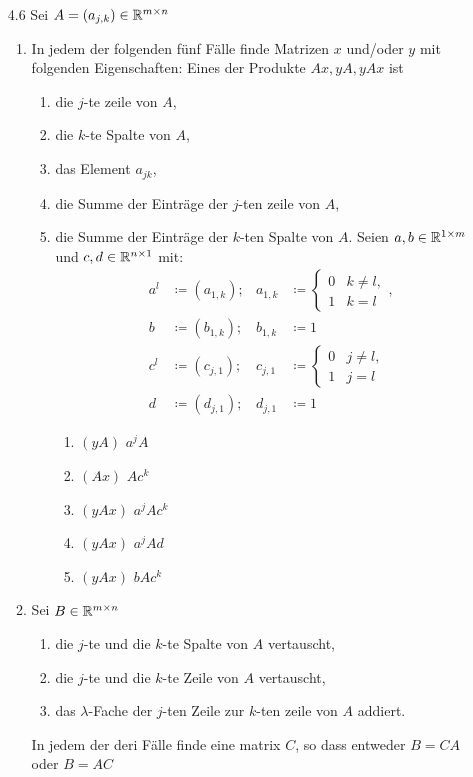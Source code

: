 \documentclass{HM}
\begin{document}
\begin{enumerate}
\begin{enumerate}
\end{enumerate}
\item [4.6] Sei $A=(a_{j,k})\in\mathbb{R}^{m\times n}$
\begin{enumerate}
\item In jedem der folgenden fünf Fälle finde Matrizen $x$ und/oder $y$ mit folgenden Eigenschaften: Eines der Produkte $Ax, yA, yAx$ ist
\begin{enumerate}
\item die $j$-te zeile von $A$,
\item die $k$-te Spalte von $A$,
\item das Element $a_{jk}$,
\item die Summe der Einträge der $j$-ten zeile von $A$,
\item die Summe der Einträge der $k$-ten Spalte von $A$.
Seien $a,b\in\mathbb{R}^{1\times m}$ und $c,d\in\mathbb{R}^{n\times 1}$ mit:
\begin{align*}
a^l&\coloneqq (a_{1,k}); &a_{1,k}&\coloneqq\begin{cases}
0 &k\neq l,\\
1 &k=l 
\end{cases},\\
b&\coloneqq (b_{1,k}); &b_{1,k}&\coloneqq 1\\
c^l&\coloneqq (c_{j,1}); &c_{j,1}&\coloneqq \begin{cases}
0 &j\neq l,\\
1 &j=l
\end{cases}\\
d&\coloneqq (d_{j,1}); &d_{j,1}&\coloneqq 1
\end{align*}
\begin{enumerate}
\item $(yA)$  $a^jA$
\item $(Ax)$  $Ac^k$
\item $(yAx)$ $a^jAc^k$
\item $(yAx)$ $a^jAd$
\item $(yAx)$ $bAc^k$
\end{enumerate}
\end{enumerate}
\item Sei $B\in\mathbb{R}^{m\times n}$
\begin{enumerate}
\item die $j$-te und die $k$-te Spalte von $A$ vertauscht,
\item die $j$-te und die $k$-te Zeile von $A$ vertauscht,
\item das $\lambda$-Fache der $j$-ten Zeile zur $k$-ten zeile von $A$ addiert.
\end{enumerate}
In jedem der deri Fälle finde eine matrix $C$, so dass entweder $B=CA$ oder $B=AC$
\end{enumerate}
\end{enumerate}
\end{document}
